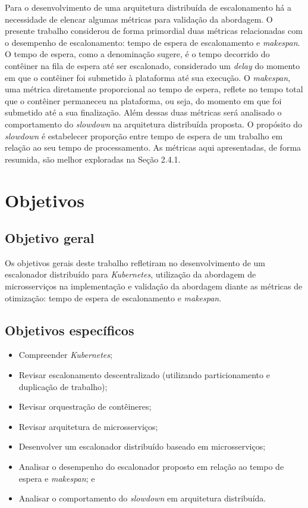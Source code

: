 Para o desenvolvimento de uma arquitetura distribuída de escalonamento há a necessidade de elencar algumas métricas para validação da abordagem. O presente trabalho considerou de forma primordial duas métricas relacionadas com o desempenho de escalonamento: tempo de espera de escalonamento e \textit{makespan}. O tempo de espera, como a denominação sugere, é o tempo decorrido do contêiner na fila de espera até ser escalonado, considerado um \textit{delay} do momento em que o contêiner foi submetido à plataforma até sua execução. O \textit{makespan}, uma métrica diretamente proporcional ao tempo de espera, reflete no tempo total que o contêiner permaneceu na plataforma, ou seja, do momento em que foi submetido até a sua finalização. Além dessas duas métricas será analisado o comportamento do \textit{slowdown} na arquitetura distribuída proposta. O propósito do \textit{slowdown} é estabelecer proporção entre tempo de espera de um trabalho em relação ao seu tempo de processamento. As métricas aqui apresentadas, de forma resumida, são melhor exploradas na Seção 2.4.1.

\section{Objetivos}
\label{obj}

\subsection{Objetivo geral}
\label{objgeral}

Os objetivos gerais deste trabalho refletiram no desenvolvimento de um escalonador distribuído para \textit{Kubernetes}, utilização da abordagem de microsserviços na implementação e validação da abordagem diante as métricas de otimização: tempo de espera de escalonamento e \textit{makespan}.

\subsection{Objetivos específicos}
\label{objesp}

\begin{itemize}
    \item Compreender \textit{Kubernetes};
    \item Revisar escalonamento descentralizado (utilizando particionamento e duplicação de trabalho);
    \item Revisar orquestração de contêineres;
    \item Revisar arquitetura de microsserviços;
    \item Desenvolver um escalonador distribuído baseado em microsserviços;
    \item Analisar o desempenho do escalonador proposto em relação ao tempo de espera e \textit{makespan}; e
    \item Analisar o comportamento do \textit{slowdown} em arquitetura distribuída.
\end{itemize}

